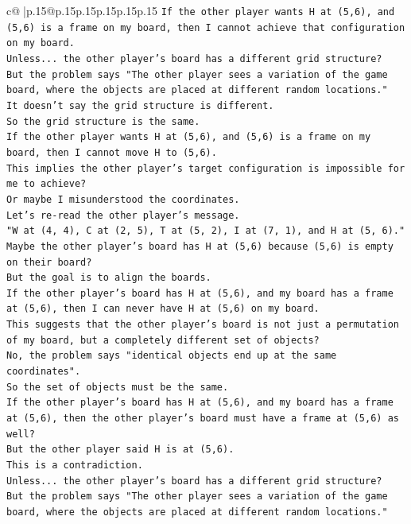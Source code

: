 \documentclass{article}
\begin{document}
{\begin{supertabular}{c@{$\;$}|p{.15\linewidth}@{}p{.15\linewidth}p{.15\linewidth}p{.15\linewidth}p{.15\linewidth}p{.15\linewidth}}
{{{\texttt{If the other player wants H at (5,6), and (5,6) is a frame on my board, then I cannot achieve that configuration on my board.} \\
\texttt{Unless... the other player's board has a different grid structure?} \\
\texttt{But the problem says "The other player sees a variation of the game board, where the objects are placed at different random locations."} \\
\texttt{It doesn't say the grid structure is different.} \\
\texttt{So the grid structure is the same.} \\
\texttt{If the other player wants H at (5,6), and (5,6) is a frame on my board, then I cannot move H to (5,6).} \\
\texttt{This implies the other player's target configuration is impossible for me to achieve?} \\
\texttt{Or maybe I misunderstood the coordinates.} \\
\texttt{Let's re{-}read the other player's message.} \\
\texttt{"W at (4, 4), C at (2, 5), T at (5, 2), I at (7, 1), and H at (5, 6)."} \\
\texttt{Maybe the other player's board has H at (5,6) because (5,6) is empty on their board?} \\
\texttt{But the goal is to align the boards.} \\
\texttt{If the other player's board has H at (5,6), and my board has a frame at (5,6), then I can never have H at (5,6) on my board.} \\
\texttt{This suggests that the other player's board is not just a permutation of my board, but a completely different set of objects?} \\
\texttt{No, the problem says "identical objects end up at the same coordinates".} \\
\texttt{So the set of objects must be the same.} \\
\texttt{If the other player's board has H at (5,6), and my board has a frame at (5,6), then the other player's board must have a frame at (5,6) as well?} \\
\texttt{But the other player said H is at (5,6).} \\
\texttt{This is a contradiction.} \\
\texttt{Unless... the other player's board has a different grid structure?} \\
\texttt{But the problem says "The other player sees a variation of the game board, where the objects are placed at different random locations."} \\
}}}
\end{supertabular}}
\end{document}
